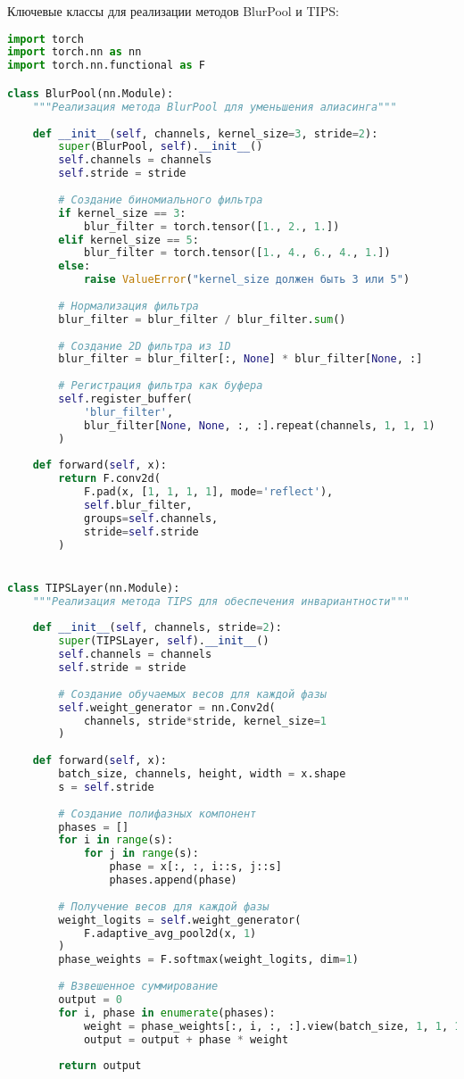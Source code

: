 Ключевые классы для реализации методов BlurPool и TIPS:

\begin{lstlisting}[language=Python]
import torch
import torch.nn as nn
import torch.nn.functional as F

class BlurPool(nn.Module):
    """Реализация метода BlurPool для уменьшения алиасинга"""
    
    def __init__(self, channels, kernel_size=3, stride=2):
        super(BlurPool, self).__init__()
        self.channels = channels
        self.stride = stride
        
        # Создание биномиального фильтра
        if kernel_size == 3:
            blur_filter = torch.tensor([1., 2., 1.])
        elif kernel_size == 5:
            blur_filter = torch.tensor([1., 4., 6., 4., 1.])
        else:
            raise ValueError("kernel_size должен быть 3 или 5")
            
        # Нормализация фильтра
        blur_filter = blur_filter / blur_filter.sum()
        
        # Создание 2D фильтра из 1D
        blur_filter = blur_filter[:, None] * blur_filter[None, :]
        
        # Регистрация фильтра как буфера
        self.register_buffer(
            'blur_filter', 
            blur_filter[None, None, :, :].repeat(channels, 1, 1, 1)
        )
        
    def forward(self, x):
        return F.conv2d(
            F.pad(x, [1, 1, 1, 1], mode='reflect'),
            self.blur_filter, 
            groups=self.channels,
            stride=self.stride
        )


class TIPSLayer(nn.Module):
    """Реализация метода TIPS для обеспечения инвариантности"""
    
    def __init__(self, channels, stride=2):
        super(TIPSLayer, self).__init__()
        self.channels = channels
        self.stride = stride
        
        # Создание обучаемых весов для каждой фазы
        self.weight_generator = nn.Conv2d(
            channels, stride*stride, kernel_size=1
        )
        
    def forward(self, x):
        batch_size, channels, height, width = x.shape
        s = self.stride
        
        # Создание полифазных компонент
        phases = []
        for i in range(s):
            for j in range(s):
                phase = x[:, :, i::s, j::s]
                phases.append(phase)
        
        # Получение весов для каждой фазы
        weight_logits = self.weight_generator(
            F.adaptive_avg_pool2d(x, 1)
        )
        phase_weights = F.softmax(weight_logits, dim=1)
        
        # Взвешенное суммирование
        output = 0
        for i, phase in enumerate(phases):
            weight = phase_weights[:, i, :, :].view(batch_size, 1, 1, 1)
            output = output + phase * weight
            
        return output
\end{lstlisting}

